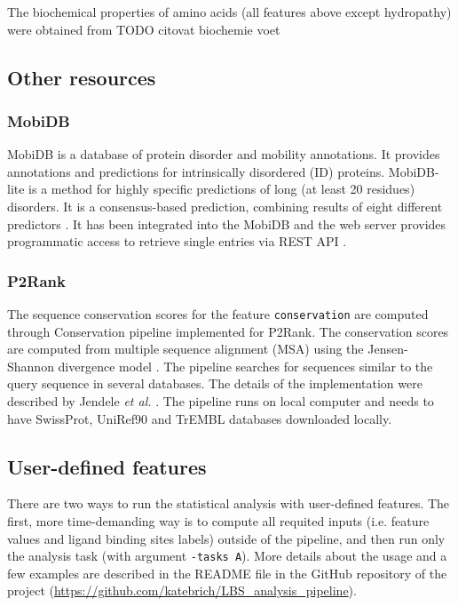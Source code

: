The biochemical properties of amino acids (all features above except hydropathy) were obtained from TODO citovat biochemie voet

\subsection{Other resources}

\subsubsection{MobiDB}

MobiDB is a database of protein disorder and mobility annotations. It provides annotations and predictions for intrinsically disordered (ID) proteins. MobiDB-lite is a method for highly specific predictions of long (at least 20 residues) disorders. It is a consensus-based prediction, combining results of eight different predictors
\cite{mobidb}. It has been integrated into the MobiDB and the web server provides programmatic access to retrieve single entries via REST API \cite{mobidbApi}.

\subsubsection{P2Rank} \label{s:conservation}

The sequence conservation scores for the feature \texttt{conservation} are computed through Conservation pipeline \cite{conservation} implemented for P2Rank. The conservation scores are computed from multiple sequence alignment (MSA) using the Jensen-Shannon divergence model \cite{jensen}. The pipeline searches for sequences similar to the query sequence in several databases. The details of the implementation were described by Jendele \textit{et al.} \cite{prankweb}.
The pipeline runs on local computer and needs to have SwissProt, UniRef90 and TrEMBL databases downloaded locally.

\subsection{User-defined features}

There are two ways to run the statistical analysis with user-defined features. The first, more time-demanding way is to compute all requited inputs (i.e. feature values and ligand binding sites labels) outside of the pipeline, and then run only the analysis task (with argument \texttt{-tasks A}). More details about the usage and a few  examples are described in the README file in the GitHub repository of the project (\url{https://github.com/katebrich/LBS_analysis_pipeline}).

